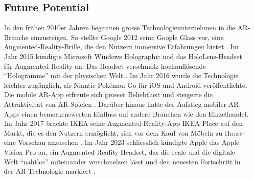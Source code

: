 \subsection{Future Potential}

In den frühen 2010er Jahren begannen grosse Technologieunternehmen in die AR-Branche einzusteigen. So stellte Google 2012 seine Google Glass vor, eine Augmented-Reality-Brille, die den Nutzern immersive Erfahrungen bietet \cite{Google_for_Developer_2012}. Im Jahr 2015 kündigte Microsoft Windows Holographic und das HoloLens-Headset für Augmented Reality an. Das Headset verschmolz hochauflösende “Hologramme” mit der physischen Welt \cite{Tech_Discussion_2015}. Im Jahr 2016 wurde die Technologie leichter zugänglich, als Niantic Pokémon Go für iOS und Android veröffentlichte. Die mobile AR-App erfreute sich grosser Beliebtheit und steigerte die Attraktivität von AR-Spielen \cite{Bond_2016}. Darüber hinaus hatte der Aufstieg mobiler AR-Apps einen bemerkenswerten Einfluss auf andere Branchen wie den Einzelhandel. Im Jahr 2017 brachte IKEA seine Augmented-Reality-App IKEA Place auf den Markt, die es den Nutzern ermöglicht, sich vor dem Kauf von Möbeln zu Hause eine Vorschau anzusehen \cite{IKEA_2017}. Im Jahr 2023 schliesslich kündigte Apple das Apple Vision Pro an, ein Augmented-Reality-Headset, das die reale und die digitale Welt “nahtlos” miteinander verschmelzen lässt und den neuesten Fortschritt in der AR-Technologie markiert \cite{Apple}.
